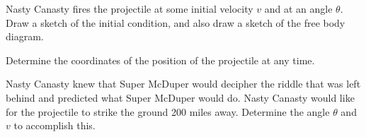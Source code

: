 \begin{problem}
  \begin{subproblem}
  \item Nasty Canasty fires the projectile at some initial velocity
    $v$ and at an angle $\theta$. Draw a sketch of the initial
    condition, and also draw a sketch of the free body diagram.

    \vfill

  \item Determine the coordinates of the position of the projectile at
    any time.

    \vfill

    \clearpage

  \item Nasty Canasty knew that Super McDuper would decipher the
    riddle that was left behind and predicted what Super McDuper would
    do. Nasty Canasty would like for the projectile to strike the
    ground 200 miles away. Determine the angle $\theta$ and $v$ to
    accomplish this.

    \vfill

  \end{subproblem}
\end{problem}



